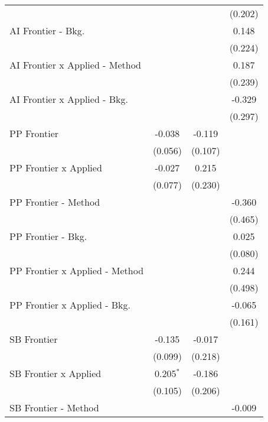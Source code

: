 \begin{tabular}{lccc}
                                  &               &         & (0.202)\\   
   AI Frontier - Bkg.             &               &         & 0.148\\   
                                  &               &         & (0.224)\\   
   AI Frontier x Applied - Method &               &         & 0.187\\   
                                  &               &         & (0.239)\\   
   AI Frontier x Applied - Bkg.   &               &         & -0.329\\   
                                  &               &         & (0.297)\\   
   PP Frontier                    & -0.038        & -0.119  &   \\   
                                  & (0.056)       & (0.107) &   \\   
   PP Frontier x Applied          & -0.027        & 0.215   &   \\   
                                  & (0.077)       & (0.230) &   \\   
   PP Frontier - Method           &               &         & -0.360\\   
                                  &               &         & (0.465)\\   
   PP Frontier - Bkg.             &               &         & 0.025\\   
                                  &               &         & (0.080)\\   
   PP Frontier x Applied - Method &               &         & 0.244\\   
                                  &               &         & (0.498)\\   
   PP Frontier x Applied - Bkg.   &               &         & -0.065\\   
                                  &               &         & (0.161)\\   
   SB Frontier                    & -0.135        & -0.017  &   \\   
                                  & (0.099)       & (0.218) &   \\   
   SB Frontier x Applied          & 0.205$^{*}$   & -0.186  &   \\   
                                  & (0.105)       & (0.206) &   \\   
   SB Frontier - Method           &               &         & -0.009\\   

\end{tabular}
